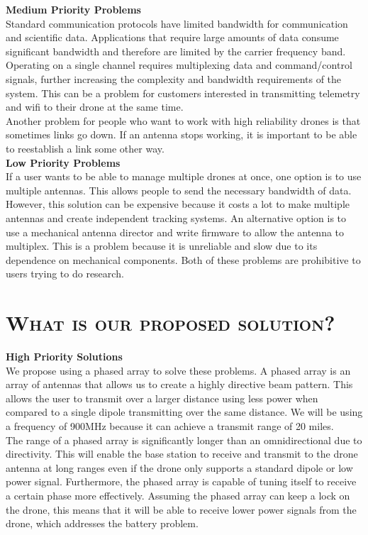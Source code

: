 \documentclass[11pt]{article}
\numberwithin{figure}{section}
\begin{document}
	\textbf{Medium Priority Problems} \\
	Standard communication protocols have limited bandwidth for communication and scientific data.  Applications that require large amounts of data consume significant bandwidth and therefore are limited by the carrier frequency band.  Operating on a single channel requires multiplexing data and command/control signals, further increasing the complexity and bandwidth requirements of the system.  This can be a problem for customers interested in transmitting telemetry and wifi to their drone at the same time.  \\
	
	Another problem for people who want to work with high reliability drones is that sometimes links go down.  If an antenna stops working, it is important to be able to reestablish a link some other way.  \\
	
	\textbf{Low Priority Problems} \\
	If a user wants to be able to manage multiple drones at once, one option is to use multiple antennas.  This allows people to send the necessary bandwidth of data.  However, this solution can be expensive because it costs a lot to make multiple antennas and create independent tracking systems.  An alternative option is to use a mechanical antenna director and write firmware to allow the antenna to multiplex.  This is a problem because it is unreliable and slow due to its dependence on mechanical components.  Both of these problems are prohibitive to users trying to do research.
	

	
\section{\textsc{What is our proposed solution?}}
	\textbf{High Priority Solutions}  \\
	We propose using a phased array to solve these problems.  A phased array is an array of antennas that allows us to create a highly directive beam pattern.  This allows the user to transmit over a larger distance using less power when compared to a single dipole transmitting over the same distance.  We will be using a frequency of 900MHz because it can achieve a transmit range of 20 miles.  \\
	
	The range of a phased array is significantly longer than an omnidirectional due to directivity.  This will enable the base station to receive and transmit to the drone antenna at long ranges even if the drone only supports a standard dipole or low power signal.  Furthermore, the phased array is capable of tuning itself to receive a certain phase more effectively.  Assuming the phased array can keep a lock on the drone, this means that it will be able to receive lower power signals from the drone, which addresses the battery problem.  \\
	
\end{document}
